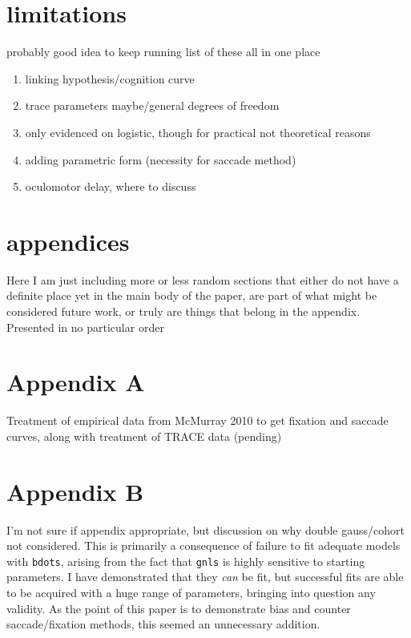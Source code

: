 \documentclass{article}
\newcommand{\xt}{\texttt}%
\begin{document}
\section{limitations}

probably good idea to keep running list of these all in one place

\begin{singlespace}
\begin{enumerate}
\item linking hypothesis/cognition curve
\item trace parameters maybe/general degrees of freedom
\item only evidenced on logistic, though for practical not theoretical reasons
\item adding parametric form (necessity for saccade method)
\item oculomotor delay, where to discuss
\end{enumerate}
\end{singlespace}


\section{appendices}

Here  I am just including more or less random sections that either do not have a definite place yet in the main body of the paper, are part of what might be considered future work, or truly are things that belong in the appendix. Presented in no particular order

\section*{Appendix A}

Treatment of empirical data from McMurray 2010 to get fixation and saccade curves,  along with treatment of TRACE data (pending)

\section*{Appendix B}

I'm not sure if appendix appropriate, but discussion on why double gauss/cohort not considered. This is primarily a consequence of failure to fit adequate models with \xt{bdots}, arising from the fact that \xt{gnls} is highly sensitive to starting parameters. I have demonstrated that they \textit{can} be fit, but successful fits are able to be acquired with a huge range of parameters, bringing into question any validity. As the point of this paper is to demonstrate bias and counter saccade/fixation methods, this seemed an unnecessary addition.
\end{document}
